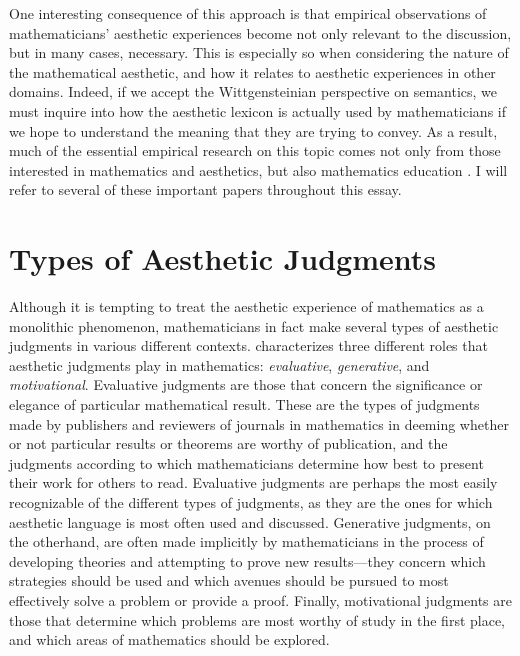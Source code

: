 \documentclass[a4paper,man,natbib]{apa6}
\begin{document}
One interesting consequence of this approach is that empirical observations of mathematicians' aesthetic experiences
become not only relevant to the discussion, but in many cases, necessary. This is especially so when considering the 
nature of the mathematical aesthetic, and how it relates to aesthetic experiences in other domains. Indeed, if we accept the
Wittgensteinian perspective on semantics, we must inquire into how the aesthetic lexicon is actually used by mathematicians if we hope to 
understand the meaning that they are trying to convey. As a result, much of the essential empirical research on this topic comes not only 
from those interested in mathematics and aesthetics, but also mathematics education \citep{dreyfus_aesthetics_1986,
inglis_beauty_2015,larvor_diversity_2016,inglis_are_2020,sa_mathematicians_2023}. I will refer to several of these 
important papers throughout this essay.

\section{Types of Aesthetic Judgments}
Although it is tempting to treat the aesthetic experience of mathematics as a monolithic phenomenon, mathematicians in
fact make several types of aesthetic judgments in various different contexts. 
\cite{sinclair_roles_2004,sinclair_aesthetic_2011} characterizes three different roles that aesthetic judgments play in mathematics:
\textit{evaluative}, \textit{generative}, and \textit{motivational}. Evaluative judgments are those that concern
the significance or elegance of particular mathematical result. These are the types of judgments made by publishers and
reviewers of journals in mathematics in deeming whether or not particular results or theorems are worthy of 
publication, and the judgments according to which mathematicians determine how best to present their work for 
others to read. Evaluative judgments are perhaps the most easily recognizable
of the different types of judgments, as they are the ones for which aesthetic language is most often used and discussed.
Generative judgments, on the otherhand, are often made implicitly by mathematicians in the process of developing theories
and attempting to prove new results---they concern which strategies should be used and which avenues should be pursued
to most effectively solve a problem or provide a proof. Finally, motivational judgments are those that determine which
problems are most worthy of study in the first place, and which areas of mathematics should be explored.
\end{document}
